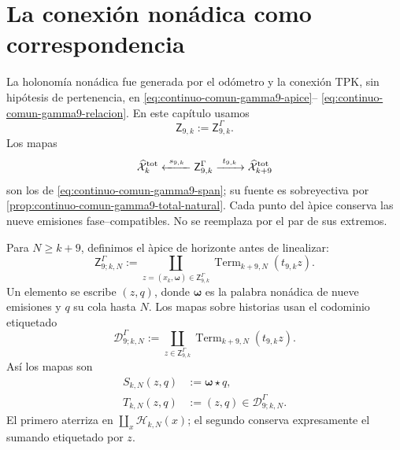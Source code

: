 \section{La conexi\'on non\'adica como correspondencia}

La holonom\'ia non\'adica fue generada por el od\'ometro y la conexi\'on TPK,
sin hip\'otesis de pertenencia, en
\eqref{eq:continuo-comun-gamma9-apice}--
\eqref{eq:continuo-comun-gamma9-relacion}. En este cap\'itulo usamos
\begin{equation}
\label{eq:pdfv2-terminal-apice-gamma9}
 \mathsf Z_{9,k}:=\mathsf Z^{\Gamma}_{9,k}.
\end{equation}
Los mapas
\begin{equation}
\label{eq:pdfv2-terminal-span-gamma9}
 \widehat{\mathcal X}^{\rm tot}_k
 \xleftarrow{\ s_{9,k}\ }
 \mathsf Z^{\Gamma}_{9,k}
 \xrightarrow{\ t_{9,k}\ }
 \widehat{\mathcal X}^{\rm tot}_{k+9}
\end{equation}
son los de \eqref{eq:continuo-comun-gamma9-span}; su fuente es sobreyectiva
por \cref{prop:continuo-comun-gamma9-total-natural}. Cada punto del \`apice
conserva las nueve emisiones fase--compatibles. No se reemplaza por el par
de sus extremos.

Para \(N\geq k+9\), definimos el \`apice de horizonte antes de linealizar:
\begin{equation}
\label{eq:pdfv2-terminal-apice-horizonte-gamma9}
 \mathsf Z^\Gamma_{9;k,N}:=
 \coprod_{z=(\widehat x_k,\boldsymbol\omega)
            \in\mathsf Z^\Gamma_{9,k}}
 \operatorname{Term}_{k+9,N}(t_{9,k}z).
\end{equation}
Un elemento se escribe \((z,q)\), donde \(\boldsymbol\omega\) es la palabra
non\'adica de nueve emisiones y \(q\) su cola hasta \(N\). Los mapas sobre
historias usan el codominio etiquetado
\begin{equation}
\label{eq:pdfv2-terminal-gamma9-codominio-colas}
 \mathscr D^\Gamma_{9;k,N}:=
 \coprod_{z\in\mathsf Z^\Gamma_{9,k}}
 \operatorname{Term}_{k+9,N}(t_{9,k}z).
\end{equation}
Así los mapas son
\begin{align}
 S_{k,N}(z,q)&:=\boldsymbol\omega\star q,
 \label{eq:pdfv2-terminal-gamma9-s-horizonte}\\
 T_{k,N}(z,q)&:=(z,q)\in\mathscr D^\Gamma_{9;k,N}.
 \label{eq:pdfv2-terminal-gamma9-t-horizonte}
\end{align}
El primero aterriza en
\(\coprod_x\mathscr H_{k,N}(x)\); el segundo conserva expresamente el
sumando etiquetado por \(z\).

